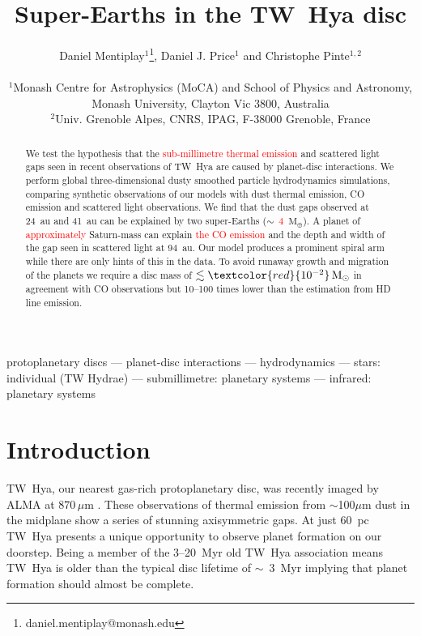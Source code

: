\documentclass[usenatbib,a4paper,times]{mnras}
\title[Super-Earths in the TW~Hya disc]{Super-Earths in the TW~Hya disc}
\author[Mentiplay, Price \& Pinte]{\parbox{\textwidth}{Daniel
   Mentiplay$^{1}$\thanks{daniel.mentiplay@monash.edu}, Daniel J. Price$^{1}$
   and Christophe Pinte$^{1,2}$}\\
   $^{1}$Monash Centre for Astrophysics (MoCA) and School of Physics and
   Astronomy, Monash University, Clayton Vic 3800, Australia \\
   $^{2}$Univ. Grenoble Alpes, CNRS, IPAG, F-38000 Grenoble, France}
\date{}
\renewcommand{\sun}{\mathrm{M}_{\odot}}
\renewcommand{\earth}{\mathrm{M}_{\oplus}}
\newcommand{\new}[1]{{\textcolor{red}{#1}}}
\begin{document}
\label{firstpage}

\maketitle


\begin{abstract}

We test the hypothesis that the \new{sub-millimetre thermal emission} and
scattered light gaps seen in recent observations of TW~Hya are caused by
planet-disc interactions. We perform global three-dimensional dusty smoothed
particle hydrodynamics simulations, comparing synthetic observations of our
models with dust thermal emission, CO emission and scattered light observations.
We find that the dust gaps observed at 24~au and 41~au can be explained by two
super-Earths ($\sim$~\new{4}~$\earth{}$). A planet of \new{approximately}
Saturn-mass can explain \new{the CO emission} and the depth and width of the gap
seen in scattered light at 94~au. Our model produces a prominent spiral arm
while there are only hints of this in the data. To avoid runaway growth and
migration of the planets we require a disc mass of $\lesssim
\new{10^{-2}}\,\sun{}$ in agreement with CO observations but 10--100 times lower
than the estimation from HD line emission.

\end{abstract}



\begin{keywords}
protoplanetary discs --- planet-disc interactions --- hydrodynamics ---  stars:
individual (TW Hydrae) --- submillimetre: planetary systems --- infrared:
planetary systems %
\end{keywords}










\section{Introduction}

TW~Hya, our nearest gas-rich protoplanetary disc, was recently imaged by ALMA at
$870\,\mu$m \citep{andrews:2016}. These observations of thermal emission from
$\sim$100$\mu$m dust in the midplane show a series of stunning axisymmetric
gaps. At just $60$~pc \citep{gaia-collaboration:2018} TW~Hya presents a unique
opportunity to observe planet formation on our doorstep. Being a member of the
3--20~Myr old \citep{barrado-y-navascues:2006} TW~Hya association means TW~Hya
is older than the typical disc lifetime of $\sim$~3~Myr \citep{haisch:2001}
implying that planet formation should almost be complete.
\end{document}
